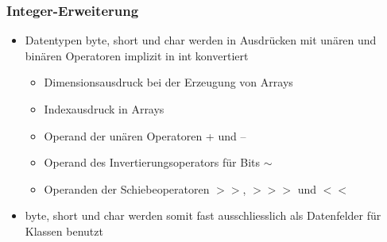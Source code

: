 \documentclass[a4paper,10pt]{article}
\begin{document}
\subsubsection{Integer-Erweiterung}
\begin{itemize}
	\item Datentypen byte, short und char werden in Ausdr\"ucken mit un\"aren und bin\"aren Operatoren implizit in int konvertiert
		\begin{itemize}
			\item Dimensionsausdruck bei der Erzeugung von Arrays
			\item Indexausdruck in Arrays
			\item Operand der un\"aren Operatoren + und –
			\item Operand des Invertierungsoperators f\"ur Bits $\sim$
			\item Operanden der Schiebeoperatoren $>>$, $>>>$ und $<<$
		\end{itemize}
	\item byte, short und char werden somit fast ausschliesslich als Datenfelder f\"ur Klassen benutzt
\end{itemize}
\end{document}

